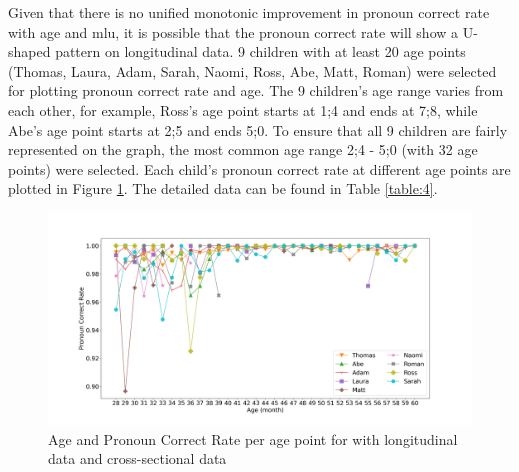 Given that there is no unified monotonic improvement in pronoun correct rate with age and mlu, it is possible that the pronoun correct rate will show a U-shaped pattern on longitudinal data. 9 children with at least 20 age points (Thomas, Laura, Adam, Sarah, Naomi, Ross, Abe, Matt, Roman) were selected for plotting pronoun correct rate and age. The 9 children's age range varies from each other, for example, Ross's age point starts at 1;4 and ends at 7;8, while Abe's age point starts at 2;5 and ends 5;0. To ensure that all 9 children are fairly represented on the graph, the most common age range 2;4 - 5;0 (with 32 age points) were selected. Each child's pronoun correct rate at different age points are plotted in Figure \ref{fig:1}. The detailed data can be found in Table \ref{table:4}. 
\vspace{-1em}
\FloatBarrier
\begin{figure}[!h]
\small
\centering
\includegraphics[scale = 0.35, width = \linewidth]{graph/Age1month.png}
\vspace{-2em}
\caption{Age and Pronoun Correct Rate per age point for with longitudinal data and cross-sectional data }
\label{fig:1}
\end{figure}
\FloatBarrier

